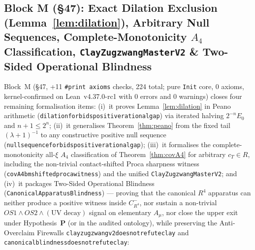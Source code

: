 \documentclass[11pt,a4paper]{article}
\def\R{R}\def\N{N}\def\Q{Q}\def\Z{Z}\def\Class{C}\def\OS{OS}\def\Gap{Gap}%
\theoremstyle{plain}
\theoremstyle{definition}
\theoremstyle{remark}
\newcommand{\R}{\mathbb{R}}\newcommand{\N}{\mathbb{N}}\newcommand{\Q}{\mathbb{Q}}
\newcommand{\Z}{\mathbb{Z}}\newcommand{\Spec}{\operatorname{Spec}}
\newcommand{\OS}{\mathrm{OS}}\newcommand{\Gap}{\mathrm{Gap}}
\newcommand{\Class}{\mathcal{C}}\newcommand{\Htot}{\mathcal{H}}
\renewcommand{\_}{\oldunderscore\allowbreak}
\newcommand{\Lean}[1]{\texttt{\small #1}}
\begin{document}
\subsection{Block M (\S47): Exact Dilation Exclusion (Lemma~\ref{lem:dilation}), Arbitrary Null Sequences, Complete-Monotonicity \texorpdfstring{$A_4$}{A4} Classification, \Lean{ClayZugzwangMasterV2} \& Two-Sided Operational Blindness}
Block~M (\S47, +11 \texttt{\#print axioms} checks, 224 total; pure \texttt{Init} core, 0 axioms, kernel-confirmed on Lean~v4.37.0-rc1 with 0 errors and 0 warnings) closes four remaining formalisation items: (i)~it proves Lemma~\ref{lem:dilation} in Peano arithmetic (\Lean{dilation\_forbids\_positive\_rational\_gap}) via iterated halving $2^{-n}E_0$ and $n+1\le 2^n$; (ii)~it generalises Theorem~\ref{thm:peano} from the fixed tail $(\lambda+1)^{-1}$ to any constructive positive null sequence (\Lean{null\_sequence\_forbids\_positive\_rational\_gap}); (iii)~it formalises the complete-monotonicity all-$\xi$ $A_4$ classification of Theorem~\ref{thm:covA4} for arbitrary $c_T\in\R$, including the non-trivial contact-shifted Proca sharpness witness (\Lean{covA4\_bm\_shifted\_proca\_witness}) and the unified \Lean{ClayZugzwangMasterV2}; and (iv)~it packages Two-Sided Operational Blindness (\Lean{CanonicalApparatusBlindness}) --- proving that the canonical $\R^4$ apparatus can neither produce a positive witness inside $\Class^-_{\R^4}$, nor sustain a non-trivial $\OS1\wedge\OS2\wedge(\text{UV decay})$ signal on elementary $A_\mu$, nor close the upper exit under Hypothesis~\textbf{P} (or in the audited ontology), while preserving the Anti-Overclaim Firewalls \Lean{clay\_zugzwang\_v2\_does\_not\_refute\_clay} and \Lean{canonical\_blindness\_does\_not\_refute\_clay}:
\end{document}
